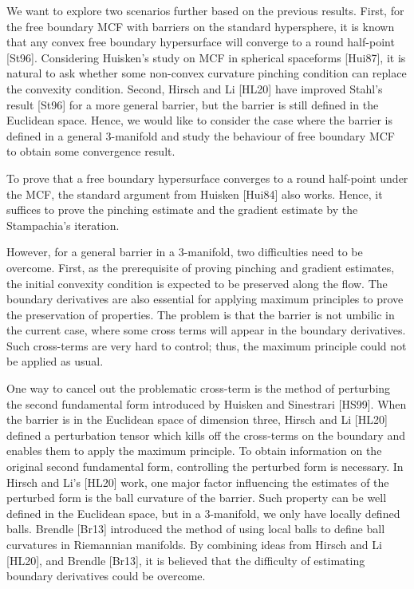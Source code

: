 We want to explore two scenarios further based on the previous results. First, for the free boundary MCF with barriers on the standard hypersphere, it is known that any convex free boundary hypersurface will converge to a round half-point [St96]. Considering Huisken's study on MCF in spherical spaceforms [Hui87], it is natural to ask whether some non-convex curvature pinching condition can replace the convexity condition. Second, Hirsch and Li [HL20] have improved Stahl's result [St96] for a more general barrier, but the barrier is still defined in the Euclidean space. Hence, we would like to consider the case where the barrier is defined in a general 3-manifold and study the behaviour of free boundary MCF to obtain some convergence result.

To prove that a free boundary hypersurface converges to a round half-point under the MCF, the standard argument from Huisken [Hui84] also works. Hence, it suffices to prove the pinching estimate and the gradient estimate by the Stampachia's iteration. 

However, for a general barrier in a 3-manifold, two difficulties need to be overcome. First, as the prerequisite of proving pinching and gradient estimates, the initial convexity condition is expected to be preserved along the flow. The boundary derivatives are also essential for applying maximum principles to prove the preservation of properties. The problem is that the barrier is not umbilic in the current case, where some cross terms will appear in the boundary derivatives. Such cross-terms are very hard to control; thus, the maximum principle could not be applied as usual.

One way to cancel out the problematic cross-term is the method of perturbing the second fundamental form introduced by Huisken and Sinestrari [HS99]. When the barrier is in the Euclidean space of dimension three, Hirsch and Li [HL20] defined a perturbation tensor which kills off the cross-terms on the boundary and enables them to apply the maximum principle. To obtain information on the original second fundamental form, controlling the perturbed form is necessary. In Hirsch and Li's [HL20] work, one major factor influencing the estimates of the perturbed form is the ball curvature of the barrier. Such property can be well defined in the Euclidean space, but in a 3-manifold, we only have locally defined balls. Brendle [Br13] introduced the method of using local balls to define ball curvatures in Riemannian manifolds. By combining ideas from Hirsch and Li [HL20], and Brendle [Br13], it is believed that the difficulty of estimating boundary derivatives could be overcome.

